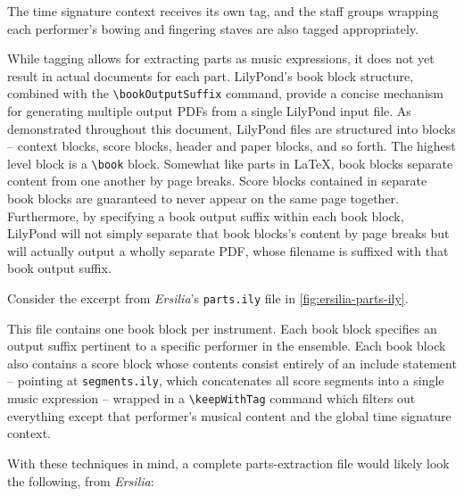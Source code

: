 \noindent The time signature context receives its own tag, and the staff groups
wrapping each performer's bowing and fingering staves are also tagged
appropriately.

While tagging allows for extracting parts as music expressions, it does not yet
result in actual documents for each part. LilyPond's book block structure,
combined with the \texttt{\textbackslash{}bookOutputSuffix} command, provide a
concise mechanism for generating multiple output PDFs from a single LilyPond
input file. As demonstrated throughout this document, LilyPond files are
structured into blocks -- context blocks, score blocks, header and paper
blocks, and so forth. The highest level block is a
\texttt{\textbackslash{}book} block. Somewhat like parts in LaTeX, book blocks
separate content from one another by page breaks. Score blocks contained in
separate book blocks are guaranteed to never appear on the same page together.
Furthermore, by specifying a book output suffix within each book block,
LilyPond will not simply separate that book blocks's content by page breaks but
will actually output a wholly separate PDF, whose filename is suffixed with
that book output suffix.

Consider the excerpt from \emph{Ersilia}'s \texttt{parts.ily} file in
\autoref{fig:ersilia-parts-ily}.


\noindent This file contains one book block per instrument. Each book block
specifies an output suffix pertinent to a specific performer in the ensemble.
Each book block also contains a score block whose contents consist entirely of
an include statement -- pointing at \texttt{segments.ily}, which concatenates
all score segments into a single music expression -- wrapped in a
\texttt{\textbackslash{}keepWithTag} command which filters out everything
except that performer's musical content and the global time signature context.

With these techniques in mind, a complete parts-extraction file would likely
look the following, from \emph{Ersilia}:


